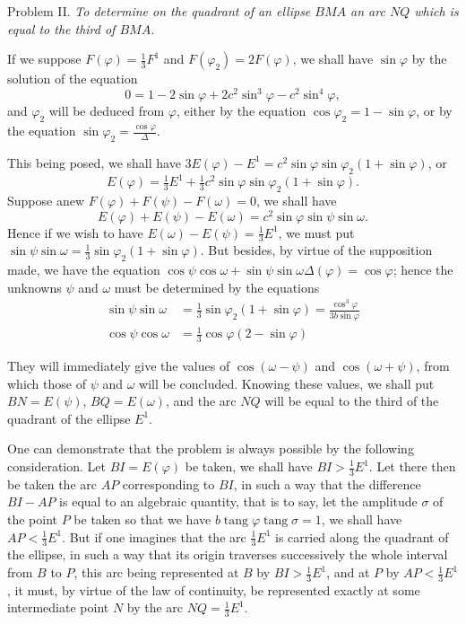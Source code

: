 \documentclass{article}
\begin{document}
Problem II. \emph{To determine on the quadrant of an ellipse $BMA$ an arc $NQ$ which is equal to the third of $BMA$.}

If we suppose $F(\varphi)=\frac{1}{3}F^{1}$ and $F(\varphi_{2})=2F(\varphi)$, we shall have $\sin\varphi$ by the solution of the equation
\[ 0=1-2\sin\varphi+2c^{2}\sin^{3}\varphi-c^{2}\sin^{4}\varphi, \]
and $\varphi_{2}$ will be deduced from $\varphi$, either by the equation $\cos\varphi_{2}=1-\sin\varphi$, or by the equation $\sin\varphi_{2}=\frac{\cos\varphi}{\Delta}$.

This being posed, we shall have $3E(\varphi)-E^{1}=c^{2}\sin\varphi\sin\varphi_{2}(1+\sin\varphi)$, or
\[ E(\varphi)=\tfrac{1}{3}E^{1}+\tfrac{1}{3}c^{2}\sin\varphi\sin\varphi_{2}(1+\sin\varphi). \]
Suppose anew $F(\varphi)+F(\psi)-F(\omega)=0$, we shall have
\[ E(\varphi)+E(\psi)-E(\omega)=c^{2}\sin\varphi\sin\psi\sin\omega. \]
Hence if we wish to have $E(\omega)-E(\psi)=\frac{1}{3}E^{1}$, we must put $\sin\psi\sin\omega=\frac{1}{3}\sin\varphi_{2}(1+\sin\varphi)$. But besides, by virtue of the supposition made, we have the equation $\cos\psi\cos\omega+\sin\psi\sin\omega\Delta(\varphi)=\cos\varphi$; hence the unknowns $\psi$ and $\omega$ must be determined by the equations
\[ \begin{aligned} \sin\psi\sin\omega&=\tfrac{1}{3}\sin\varphi_{2}(1+\sin\varphi)=\frac{\cos^{3}\varphi}{3b\sin\varphi}\\ \cos\psi\cos\omega&=\tfrac{1}{3}\cos\varphi(2-\sin\varphi) \end{aligned} \]

They will immediately give the values of $\cos(\omega-\psi)$ and $\cos(\omega+\psi)$, from which those of $\psi$ and $\omega$ will be concluded. Knowing these values, we shall put $BN=E(\psi)$, $BQ=E(\omega)$, and the arc $NQ$ will be equal to the third of the quadrant of the ellipse $E^{1}$.

One can demonstrate that the problem is always possible by the following consideration. Let $BI=E(\varphi)$ be taken, we shall have $BI>\frac{1}{3}E^{1}$. Let there then be taken the arc $AP$ corresponding to $BI$, in such a way that the difference $BI-AP$ is equal to an algebraic quantity, that is to say, let the amplitude $\sigma$ of the point $P$ be taken so that we have $b\operatorname{tang}\varphi\operatorname{tang}\sigma=1$, we shall have $AP<\frac{1}{3}E^{1}$. But if one imagines that the arc $\frac{1}{3}E^{1}$ is carried along the quadrant of the ellipse, in such a way that its origin traverses successively the whole interval from $B$ to $P$, this arc being represented at $B$ by $BI>\frac{1}{3}E^{1}$, and at $P$ by $AP<\frac{1}{3}E^{1}$, it must, by virtue of the law of continuity, be represented exactly at some intermediate point $N$ by the arc $NQ=\frac{1}{3}E^{1}$.
\end{document}
